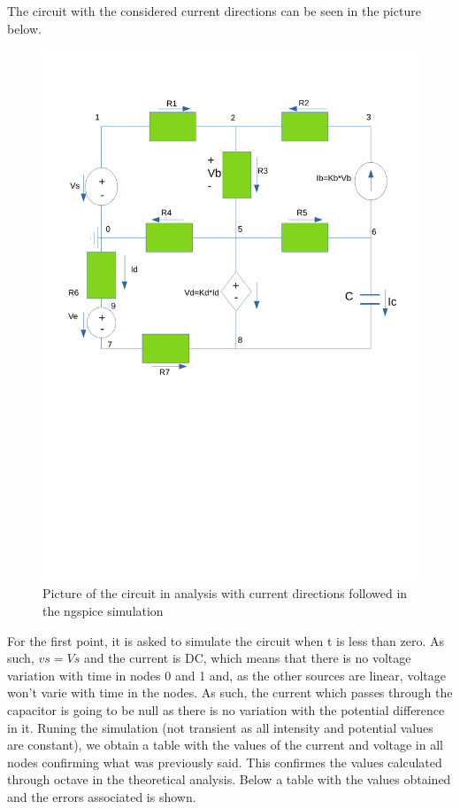 \par The circuit with the considered current directions can be seen in the picture below.

\begin{figure}[h] \centering
\includegraphics[width=0.6\linewidth]{Desenho_2.pdf}
\caption{Picture of the circuit in analysis with current directions followed in the ngspice simulation}
\label{fig:Ngspice circuit}
\end{figure}

\par For the first point, it is asked to simulate the circuit when t is less than zero. As such, $vs=Vs$ and the current is DC, which means that there is no voltage variation with time in nodes 0 and 1 and, as the other sources are linear, voltage won't varie with time in the nodes. As such, the current which passes through the capacitor is going to be null as there is no variation with the potential difference in it. Runing the simulation (not transient as all intensity and potential values are constant), we obtain a table with the values of the current and voltage in all nodes confirming what was previously said. This confirmes the values calculated through octave in the theoretical analysis. Below a table with the values obtained and the errors associated is shown.

\vspace{5mm}
\begin{table}[H]
\centering
\begin{tabularx}{0.6\textwidth} {
  | >{\raggedright\arraybackslash}X
  | >{\raggedleft\arraybackslash}X | }
 \hline

\end{tabularx}
\end{table}
\vspace{5mm}

